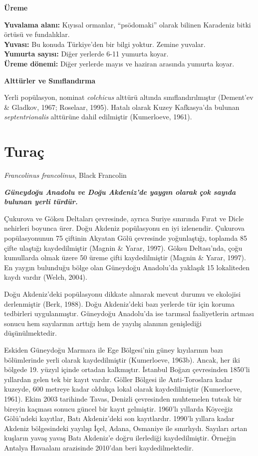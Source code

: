 \documentclass[
  a4paper,
  DIV=11,
  numbers=noendperiod]{scrreprt}
\begin{document}
\textbf{Üreme}

\textbf{Yuvalama alanı:} Kıyısal ormanlar, ``psödomaki'' olarak bilinen
Karadeniz bitki örtüsü ve fundalıklar.\\
\textbf{Yuvası:} Bu konuda Türkiye'den bir bilgi yoktur. Zemine
yuvalar.\\
\textbf{Yumurta sayısı:} Diğer yerlerde 6-11 yumurta koyar.\\
\textbf{Üreme dönemi:} Diğer yerlerde mayıs ve haziran arasında yumurta
koyar.

\textbf{Alttürler ve Sınıflandırma}

Yerli popülasyon, nominat \emph{colchicus} alttürü altında
sınıflandırılmıştır (Dement'ev \& Gladkov, 1967; Roselaar, 1995). Hatalı
olarak Kuzey Kafkasya'da bulunan \emph{septentrionalis} alttürüne dahil
edilmiştir (Kumerloeve, 1961).

\section{Turaç}\label{turauxe7}

\emph{Francolinus francolinus}, Black Francolin

\textbf{\emph{Güneydoğu Anadolu ve Doğu Akdeniz'de yaygın olarak çok
sayıda bulunan yerli türdür.}}

Çukurova ve Göksu Deltaları çevresinde, ayrıca Suriye sınırında Fırat ve
Dicle nehirleri boyunca ürer. Doğu Akdeniz popülasyonu en iyi
izlenendir. Çukurova popülasyonunun 75 çiftinin Akyatan Gölü çevresinde
yoğunlaştığı, toplamda 85 çifte ulaştığı kaydedilmiştir (Magnin \&
Yarar, 1997). Göksu Deltası'nda, çoğu kumullarda olmak üzere 50 üreme
çifti kaydedilmiştir (Magnin \& Yarar, 1997). En yaygın bulunduğu bölge
olan Güneydoğu Anadolu'da yaklaşık 15 lokaliteden kaydı vardır (Welch,
2004).

Doğu Akdeniz'deki popülasyonu dikkate alınarak mevcut durumu ve
ekolojisi derlenmiştir (Berk, 1988). Doğu Akdeniz'deki bazı yerlerde tür
için koruma tedbirleri uygulanmıştır. Güneydoğu Anadolu'da ise tarımsal
faaliyetlerin artması sonucu hem sayılarının arttığı hem de yayılış
alanının genişlediği düşünülmektedir.

Eskiden Güneydoğu Marmara ile Ege Bölgesi'nin güney kıyılarının bazı
bölümlerinde yerli olarak kaydedilmiştir (Kumerloeve, 1963b). Ancak, her
iki bölgede 19. yüzyıl içinde ortadan kalkmıştır. İstanbul Boğazı
çevresinden 1850'li yıllardan gelen tek bir kayıt vardır. Göller Bölgesi
ile Anti-Toroslara kadar kuzeyde, 600 metreye kadar oldukça lokal olarak
kaydedilmiştir (Kumerloeve, 1961). Ekim 2003 tarihinde Tavas, Denizli
çevresinden muhtemelen tutsak bir bireyin kaçması sonucu güncel bir
kayıt gelmiştir. 1960'lı yıllarda Köyceğiz Gölü'ndeki kayıtlar, Batı
Akdeniz'deki son kayıtlardır. 1990'lı yıllara kadar Akdeniz bölgesindeki
yayılışı İçel, Adana, Osmaniye ile sınırlıydı. Sayıları artan kuşların
yavaş yavaş Batı Akdeniz'e doğru ilerlediği kaydedilmiştir. Örneğin
Antalya Havaalanı arazisinde 2010'dan beri kaydedilmektedir.
\end{document}
